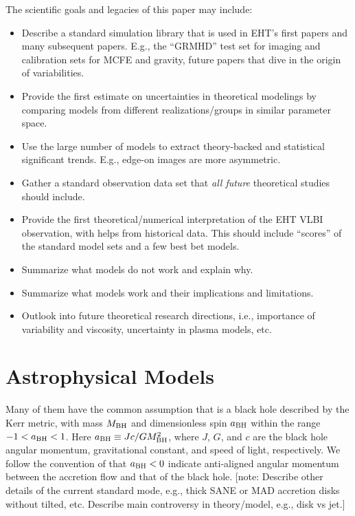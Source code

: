 \documentclass[twocolumn,twocolappendix,tighten,dvipsnames,linenumbers]{aastex63}
\newcommand\note[1]{{\color{OliveGreen}[note: #1]}}
\begin{document}
The scientific goals and legacies of this paper may include:
\begin{itemize}
\item Describe a standard simulation library that is used in EHT's
  first \sgra papers and many subsequent papers.
  E.g., the ``GRMHD'' test set for imaging and calibration sets for
  MCFE and gravity, future papers that dive in the origin of
  variabilities.
\item Provide the first estimate on uncertainties in theoretical
  modelings by comparing models from different realizations/groups in
  similar parameter space.
\item Use the large number of models to extract theory-backed and
  statistical significant trends.
  E.g., edge-on images are more asymmetric.
\item Gather a standard observation data set that \emph{all future}
  theoretical studies should include.
\item Provide the first theoretical/numerical interpretation of the
  EHT \sgra VLBI observation, with helps from historical data.
  This should include ``scores'' of the standard model sets and a few
  best bet models.
\item Summarize what models do not work and explain why.
\item Summarize what models work and their implications and
  limitations.
\item Outlook into future theoretical research directions, i.e.,
  importance of variability and viscosity, uncertainty in plasma
  models, etc.
\end{itemize}

\clearpage

\section{Astrophysical Models}

Many of them have the common assumption that \sgra is a black hole
described by the Kerr metric, with mass $M_{\rm BH}$ and dimensionless spin
${a_{\rm BH}}$ within the range $-1 < {a_{\rm BH}} < 1$.
Here ${a_{\rm BH}} \equiv Jc/GM_{\rm BH}^2$, where $J$, $G$, and $c$ are the black
hole angular momentum, gravitational constant, and speed of light,
respectively.
We follow the convention of  that
${a_{\rm BH}} < 0$ indicate anti-aligned angular momentum between the
accretion flow and that of the black hole.
\note{Describe other details of the current standard \sgra mode, e.g.,
  thick SANE or MAD accretion disks without tilted, etc.
  Describe main controversy in theory/model, e.g., disk vs jet.}
\end{document}
